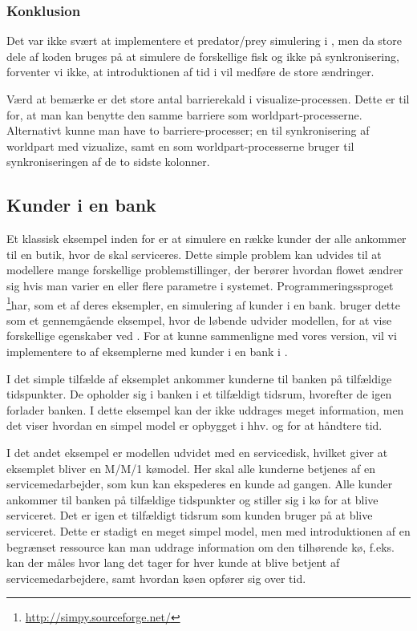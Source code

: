 \subsubsection{Konklusion} 
Det var ikke svært at implementere et predator/prey simulering i \pycsp, men da store dele af koden bruges på at simulere  de forskellige fisk og ikke på synkronisering, forventer vi ikke, at introduktionen af tid i \pycsp vil medføre de store ændringer. 

Værd at bemærke er det store antal barrierekald i 
visualize-processen. Dette er til for, at man kan benytte den samme barriere som 
worldpart-processerne. Alternativt kunne man have to barriere-processer; en til 
synkronisering af worldpart med vizualize, samt en som 
worldpart-processerne bruger til synkroniseringen af de to sidste kolonner. 

\subsection{Kunder i en bank}\label{bank-eksempel}
Et klassisk eksempel inden for \des er at simulere  en række kunder der alle 
ankommer til en butik, hvor de skal serviceres. Dette simple problem kan 
udvides til at modellere mange forskellige problemstillinger, der berører 
hvordan flowet ændrer sig hvis man varier en eller flere parametre
i systemet. Programmeringssproget \simpy\footnote{\url{http://simpy.sourceforge.net/}}har, som et af deres 
eksempler, en simulering af kunder i en bank. \simpy bruger dette som et 
gennemgående eksempel, hvor de løbende udvider modellen, for at vise 
forskellige egenskaber ved \simpy. For at kunne sammenligne \simpy  med vores 
version, vil vi implementere to af eksemplerne med kunder 
i en bank i \pycsp.

I det simple tilfælde af eksemplet ankommer kunderne til banken på 
tilfældige tidspunkter.  De opholder sig i banken i et tilfældigt 
tidsrum, hvorefter de igen forlader banken. I dette eksempel kan der ikke 
uddrages meget information, men det viser hvordan en simpel model er opbygget i 
hhv.  \simpy og \pycsp for at håndtere tid.

I det andet eksempel er modellen udvidet med en servicedisk, hvilket giver at eksemplet bliver en M/M/1 kømodel. Her skal alle 
kunderne betjenes af en servicemedarbejder, som kun kan ekspederes en kunde ad 
gangen. Alle kunder ankommer til banken på tilfældige tidspunkter  og stiller sig i 
kø for at blive serviceret. Det er igen et tilfældigt tidsrum som kunden bruger på at blive 
serviceret.  Dette er stadigt en meget simpel model, men med introduktionen af 
en begrænset ressource kan man uddrage information om den tilhørende kø, f.eks. 
kan der måles hvor lang det tager for hver kunde at blive betjent af 
servicemedarbejdere, samt hvordan køen opfører sig over tid. 

